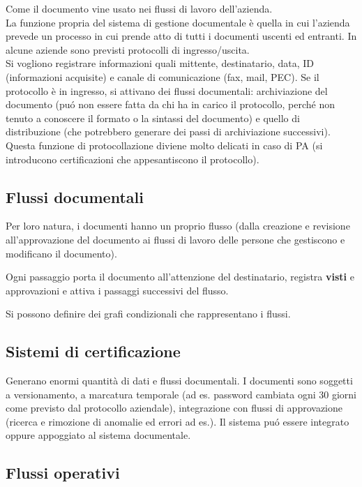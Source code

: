 Come il documento vine usato nei flussi di lavoro dell'azienda.\\
La funzione propria del sistema di gestione documentale \`e quella in cui
l'azienda prevede un processo in cui prende atto di tutti i documenti
uscenti ed entranti. In alcune aziende sono previsti protocolli di 
ingresso/uscita.\\

Si vogliono registrare informazioni quali mittente, destinatario, data, ID 
(informazioni acquisite) e canale di comunicazione (fax, mail, PEC). 
Se il protocollo \`e in ingresso, si attivano dei flussi documentali: 
archiviazione del documento (pu\'o non essere fatta da chi ha in carico il 
protocollo, perch\'e non tenuto a conoscere il formato o la sintassi del 
documento) e quello di distribuzione (che potrebbero generare dei passi di 
archiviazione successivi).\\
Questa funzione di protocollazione diviene molto delicati in caso di PA
(si introducono certificazioni che appesantiscono il protocollo).

\subsection{Flussi documentali}

Per loro natura, i documenti hanno un proprio flusso (dalla creazione e
revisione all'approvazione del documento ai flussi di lavoro delle
persone che gestiscono e modificano il documento).

Ogni passaggio porta il documento all'attenzione del destinatario, registra 
\textbf{visti} e approvazioni e attiva i passaggi successivi del flusso.

Si possono definire dei grafi condizionali che rappresentano i flussi.

\subsection{Sistemi di certificazione}

Generano enormi quantit\`a di dati e flussi documentali. I documenti sono 
soggetti a versionamento, a marcatura temporale (ad es. password cambiata ogni 
30 giorni come previsto dal protocollo aziendale), integrazione con flussi di
approvazione (ricerca e rimozione di anomalie ed errori ad es.). Il
sistema pu\'o essere integrato oppure appoggiato al sistema documentale.

\subsection{Flussi operativi}

